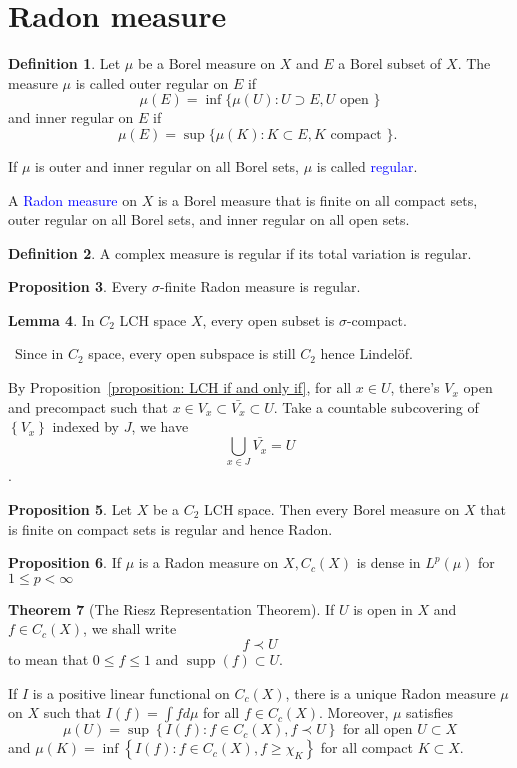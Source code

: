 \documentclass[12pt,a4paper]{book}
\newenvironment{prooff}{{\noindent\it\textcolor{cyan!40!black}{Proof}:}\,}{\par}
\newcommand{\bbrace}[1]{\left\{ #1 \right\} }
\newcommand{\blue}[1]{\textcolor{blue}{#1}}
\theoremstyle{definition}
\newtheorem{defn}{Definition}[section]
\newtheorem{theo}[defn]{Theorem}
\newtheorem{lem}[defn]{Lemma}
\newtheorem{prop}[defn]{Proposition}
\begin{document}
\section{Radon measure}
\begin{defn}
    Let $\mu$ be a Borel measure on $X$ and $E$ a Borel subset of $X$. The measure $\mu$ is called outer regular on $E$ if
    $$
        \mu(E)=\inf \{\mu(U): U \supset E, U \text { open }\}
    $$
    and inner regular on $E$ if
    $$
        \mu(E)=\sup \{\mu(K): K \subset E, K \text { compact }\} \text {. }
    $$

    If $\mu$ is outer and inner regular on all Borel sets,
    $\mu$ is called \blue{regular}.

    A \blue{Radon measure} on $X$ is a Borel measure that is finite on all compact sets, outer regular on all Borel sets, and inner regular on all open sets.
\end{defn}
\begin{defn}
    A complex measure is regular if its total variation is regular.
\end{defn}
\begin{prop}
    Every $\sigma$-finite Radon measure is regular.
\end{prop}
\begin{lem}
    In $C_2$ LCH space $X$, every open subset is $\sigma$-compact.
\end{lem}
\begin{prooff}
    Since in $C_2$ space, every open subspace is still $C_2$ hence Lindelöf.

    By Proposition~\ref{proposition: LCH if and only if}, for all $x\in U$, there's $V_x$ open and precompact such that $x\in V_x\subset \bar{V_x}\subset U$.
    Take a countable subcovering of $\bbrace{V_x}$ indexed by $J$, we have $$\bigcup_{x\in J} \bar{V_x}=U$$.
\end{prooff}
\begin{prop}
    Let $X$ be a $C_2$ LCH space.
    Then every Borel measure on $X$ that is finite on compact sets is regular and hence Radon.
\end{prop}
\begin{prop}
    If $\mu$ is a Radon measure on $X, C_c(X)$ is dense in $L^p(\mu)$ for $1 \leq p<\infty$
\end{prop}
\begin{theo}[The Riesz Representation Theorem]
    If $U$ is open in $X$ and $f \in C_c(X)$, we shall write
    $$
        f \prec U
    $$
    to mean that $0 \leq f \leq 1$ and $\operatorname{supp}(f) \subset U$.

    If $I$ is a positive linear functional on $C_c(X)$, there is a unique Radon measure $\mu$ on $X$ such that $I(f)=\int f d \mu$ for all $f \in C_c(X)$. Moreover, $\mu$ satisfies
    $$
        \mu(U)=\sup \left\{I(f): f \in C_c(X), f \prec U\right\} \text { for all open } U \subset X
    $$
    and
    $\mu(K)=\inf \left\{I(f): f \in C_c(X), f \geq \chi_K\right\}$ for all compact $K \subset X$.
\end{theo}
\end{document}

